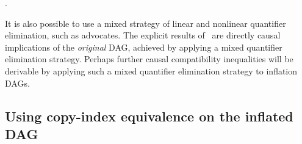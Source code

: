 {{%
}.

It is also possible to use a mixed strategy of linear and nonlinear quantifier elimination, such as \citet{ChavesPolynomial} advocates. The explicit results of~\cite{ChavesPolynomial} are directly causal implications of the \emph{original} DAG, achieved by applying a mixed quantifier elimination strategy. Perhaps further causal compatibility inequalities will be derivable by applying such a mixed quantifier elimination strategy to inflation DAGs.

\subsection{Using copy-index equivalence on the inflated DAG}\label{Sec:copyindexequivalence}

}
